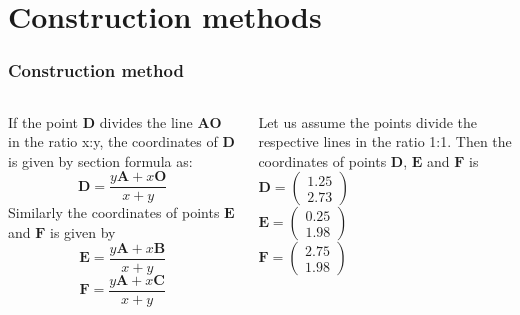 \documentclass{beamer}
\renewcommand{\vec}[1]{\mathbf{#1}}
\begin{document}
\section*{Construction methods}
\begin{frame}[fragile]
\footnotesize
\frametitle{Construction method}
\begin{columns}
\begin{column}{0.5\textwidth}

 If the point $\vec{D}$ divides the line $\vec{AO}$ in the ratio x:y, the coordinates of $\vec{D}$ is given by section formula as:
\begin{equation} \vec{D} = \frac{y\vec{A} + x\vec{O}}{x+y}\end{equation}
Similarly the coordinates of points $\vec{E}$ and $\vec{F}$ is given by
\begin{equation} \vec{E} = \frac{y\vec{A} + x\vec{B}}{x+y}\end{equation}
\begin{equation} \vec{F} = \frac{y\vec{A} + x\vec{C}}{x+y}\end{equation}

 \end{column}
 
 
\begin{column}{0.5\textwidth} 
Let us assume the points divide the respective lines in the ratio 1:1. Then the coordinates of points $\vec{D}$, $\vec{E}$ and $\vec{F}$ is \\
 \quad $ \vec{D}= \begin{pmatrix}1.25\\2.73\end{pmatrix}$\\
    \quad $\vec{E}=\begin{pmatrix}0.25\\1.98\end{pmatrix}$\\
    \quad $\vec{F}=\begin{pmatrix}2.75\\1.98\end{pmatrix}$\\
  
 \end{column}
\end{columns}
\end{frame}
\end{document}
